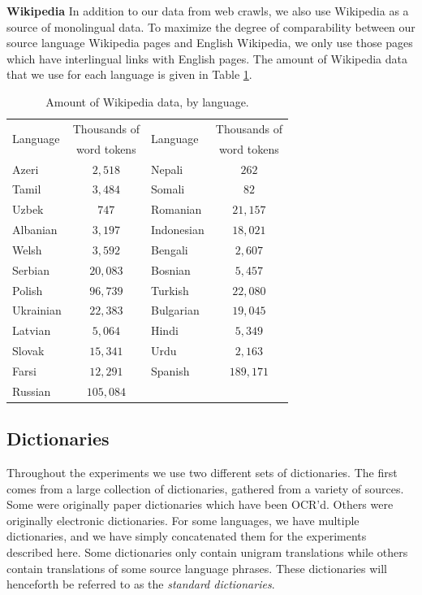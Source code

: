 \documentclass[11pt]{article}
\begin{document}
{\bf Wikipedia} In addition to our data from web crawls, we also use Wikipedia as a source of monolingual data. To maximize the degree of comparability between our source language Wikipedia pages and English Wikipedia, we only use those pages which have interlingual links with English pages. The amount of Wikipedia data that we use for each language is given in Table \ref{table:wiki}.

\begin{table}\footnotesize
\begin{center}
\begin{tabular}{|l|c|l|c|}
\hline
\multirow{2}{*}{Language} & Thousands of & \multirow{2}{*}{Language} & Thousands of \\
&word tokens&&word tokens\\
\hline
Azeri & $2,518$ & Nepali & $262$ \\
Tamil & $3,484$ & Somali & $82$\\
Uzbek & $747$ & Romanian & $21,157$ \\
Albanian & $3,197$ & Indonesian & $18,021$ \\
Welsh & $3,592$ & Bengali & $2,607$ \\
Serbian & $20,083$ & Bosnian & $5,457$ \\
Polish & $96,739$ & Turkish & $22,080$ \\
Ukrainian & $22,383$ & Bulgarian & $19,045$\\
Latvian & $5,064$ & Hindi & $5,349$\\
Slovak & $15,341$ & Urdu & $2,163$\\
Farsi & $12,291$ & Spanish & $189,171$\\
Russian & $105,084$ & &\\
\hline
\end{tabular}
\end{center}
\caption{\label{table:wiki}Amount of Wikipedia data, by language.}
\end{table}

\subsection {Dictionaries}\label{ssec:dicts}

Throughout the experiments we use two different sets of dictionaries. The first comes from a large collection of dictionaries, gathered from a variety of sources. Some were originally paper dictionaries which have been OCR'd. Others were originally electronic dictionaries. For some languages, we have multiple dictionaries, and we have simply concatenated them for the experiments described here. Some dictionaries only contain unigram translations while others contain translations of some source language phrases. These dictionaries will henceforth be referred to as the {\it standard dictionaries}. 
\end{document}
